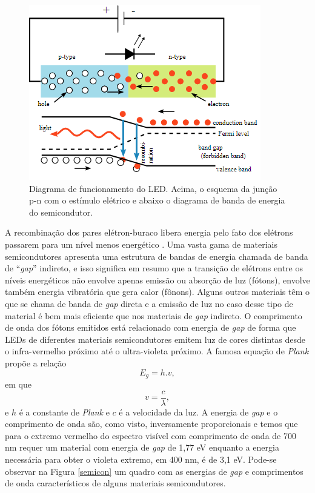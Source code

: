 \begin{figure}[ht]
    \begin{center}
    \includegraphics{figuras/led.PNG}
    \end{center}
    \caption[Diagrama de funcionamento do LED.]{Diagrama de funcionamento do LED. Acima, o esquema da junção p-n com o estímulo elétrico e abaixo o diagrama de banda de energia do semicondutor.}
    \label{led}
\end{figure}


A recombinação dos pares elétron-buraco libera energia pelo fato dos elétrons passarem para um nível menos energético \cite{rezende}. Uma vasta gama de materiais semicondutores apresenta uma estrutura de bandas de energia chamada de banda de ``\emph{gap}'' indireto, e isso significa em resumo que a transição de elétrons entre os níveis energéticos não envolve apenas emissão ou absorção de luz (fótons), envolve também energia vibratória que gera calor (fônons). Alguns outros materiais têm o que se chama de banda de \emph{gap} direta e a emissão de luz no caso desse tipo de material é bem mais eficiente que nos materiais de \emph{gap} indireto. O comprimento de onda dos fótons emitidos está relacionado com energia de \emph{gap} de forma que LEDs de diferentes materiais semicondutores emitem luz de cores distintas desde o infra-vermelho próximo até o ultra-violeta próximo. A famosa equação de \textit{Plank} propõe a relação
\begin{equation}
    \label{eq:led_2}
    E_g = h.v,
\end{equation}
em que
\begin{equation}
    \label{eq:led_1}
    v = \frac{c}{\lambda},
\end{equation}
e $h$ é a constante de \textit{Plank} e $c$ é a velocidade da luz. A energia de \emph{gap} e o comprimento de onda são, como visto, inversamente proporcionais e temos que para o extremo vermelho do espectro visível com comprimento de onda de 700 nm requer um material com energia de \emph{gap} de 1,77 eV enquanto a energia necessária para obter o violeta extremo, em 400 nm, é de 3,1 eV. Pode-se observar na Figura \ref{semicon} um quadro com as energias de \emph{gap} e comprimentos de onda característicos de alguns materiais semicondutores.

